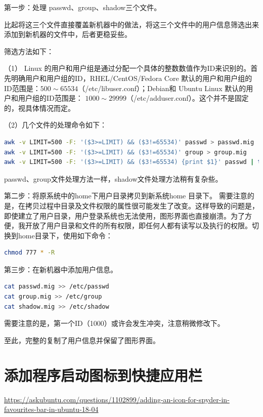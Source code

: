 {第一步：处理 passwd、group、shadow三个文件。

比起将这三个文件直接覆盖新机器中的做法，将这三个文件中的用户信息筛选出来添加到新机器的文件中，后者更稳妥些。

筛选方法如下：

（1） Linux 的用户和用户组是通过分配一个具体的整数数值作为ID来识别的。首先明确用户和用户组的ID，RHEL/CentOS/Fedora Core 默认的用户和用户组的ID范围是：$500 \sim 65534$（/etc/libuser.conf）；Debian和 Ubuntu Linux 默认的用户和用户组的ID范围是： $1000 \sim 29999$（/etc/adduser.conf）。这个并不是固定的，视具体情况而定。

（2）几个文件的处理命令如下：

 \begin{lstlisting}[language=sh]
awk -v LIMIT=500 -F: '($3>=LIMIT) && ($3!=65534)' passwd > passwd.mig
awk -v LIMIT=500 -F: '($3>=LIMIT) && ($3!=65534)' group > group.mig
awk -v LIMIT=500 -F: '($3>=LIMIT) && ($3!=65534) {print $1}' passwd | tee - |egrep -f - shadow > shadow.mig
\end{lstlisting}
passwd、group文件处理方法一样，shadow文件处理方法稍有复杂些。


第二步：将原系统中的home下用户目录拷贝到新系统home 目录下。{\color{red} 需要注意的是}，在拷贝过程中目录及文件权限的属性很可能发生了改变。这样导致的问题是，即使建立了用户目录，用户登录系统也无法使用，图形界面也直接崩溃。为了方便，我开放了用户目录和文件的所有权限，即任何人都有读写以及执行的权限。切换到home目录下，使用如下命令：
 \begin{lstlisting}[language=sh]
 chmod 777 * -R
\end{lstlisting}

第三步：在新机器中添加用户信息。
 \begin{lstlisting}[language=sh]
cat passwd.mig >> /etc/passwd
cat group.mig >> /etc/group
cat shadow.mig >> /etc/shadow
\end{lstlisting}
{\color{red}需要注意的是}，第一个ID（1000）或许会发生冲突，注意稍微修改下。

至此，完整的复制了用户信息并保留了图形界面。




\section{添加程序启动图标到快捷应用栏}


\url{https://askubuntu.com/questions/1102899/adding-an-icon-for-spyder-in-favourites-bar-in-ubuntu-18-04}




}
